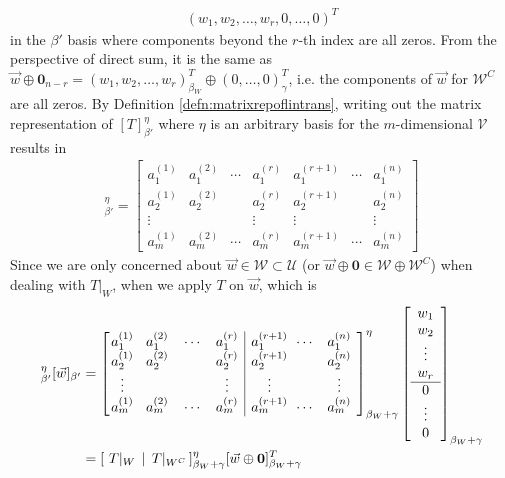 \begin{align*}
(w_1, w_2, \ldots, w_r, 0, \ldots, 0)^T
\end{align*}
in the $\mathcal{\beta}'$ basis where components beyond the $r$-th index are all zeros. From the perspective of direct sum, it is the same as $\vec{w} \oplus \textbf{0}_{n-r} = (w_1, w_2, \ldots, w_r)_{\beta_W}^T \oplus (0, \ldots, 0)_{\gamma}^T$, i.e. the components of $\vec{w}$ for $\mathcal{W}^C$ are all zeros. By Definition \ref{defn:matrixrepoflintrans}, writing out the matrix representation of $[T]_{\beta'}^\eta$ where $\eta$ is an arbitrary basis for the $m$-dimensional $\mathcal{V}$ results in
\begin{align*}
[T]_{\beta'}^\eta = \begin{bmatrix}
a_1^{(1)} & a_1^{(2)} & \cdots & a_1^{(r)} & a_1^{(r+1)} & \cdots & a_1^{(n)} \\
a_2^{(1)} & a_2^{(2)} & & a_2^{(r)} & a_2^{(r+1)} & & a_2^{(n)} \\
\vdots & & & \vdots & \vdots & & \vdots \\
a_m^{(1)} & a_m^{(2)} & \cdots & a_m^{(r)} & a_m^{(r+1)} & \cdots & a_m^{(n)}
\end{bmatrix}
\end{align*}
Since we are only concerned about $\vec{w} \in \mathcal{W} \subset \mathcal{U}$ (or $\vec{w} \oplus \textbf{0} \in \mathcal{W} \oplus \mathcal{W}^C$) when dealing with $T|_W$, when we apply $T$ on $\vec{w}$, which is
\begin{align}
[T]_{\beta'}^\eta[\vec{w}]_{\beta'}
&=
\left[\begin{array}{@{\,}wc{15pt}wc{15pt}wc{15pt}wc{15pt}|@{\quad}wc{15pt}wc{15pt}wc{15pt}}
a_1^{(1)} & a_1^{(2)} & \cdots & a_1^{(r)} & a_1^{(r+1)} & \cdots & a_1^{(n)} \\
a_2^{(1)} & a_2^{(2)} & & a_2^{(r)} & a_2^{(r+1)} & & a_2^{(n)} \\
\vdots & & & \vdots & \vdots & & \vdots \\
a_m^{(1)} & a_m^{(2)} & \cdots & a_m^{(r)} & a_m^{(r+1)} & \cdots & a_m^{(n)}
\end{array}\right]_{\beta_W+\gamma}^\eta
\left[\begin{array}{c}
w_1 \\
w_2 \\
\vdots \\
w_r \\
\hline
0 \\
\vdots \\
0
\end{array}\right]_{\beta_W+\gamma} \nonumber \\
&= [\,\, T|_W \,\mid\, T|_{W^C} \,]_{\beta_W+\gamma}^\eta [\vec{w} \oplus \textbf{0}]^T_{\beta_W+\gamma} 
\end{align}
